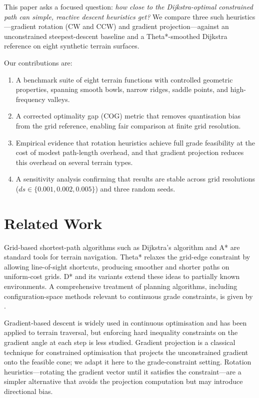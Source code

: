 \documentclass[11pt,a4paper]{article}
\begin{document}
This paper asks a focused question: \emph{how close to the Dijkstra-optimal
constrained path can simple, reactive descent heuristics get?}
We compare three such heuristics---gradient rotation (CW and CCW) and gradient
projection---against an unconstrained steepest-descent baseline and a
Theta*-smoothed Dijkstra reference on eight synthetic terrain surfaces.

Our contributions are:
\begin{enumerate}
  \item A benchmark suite of eight terrain functions with controlled geometric
        properties, spanning smooth bowls, narrow ridges, saddle points, and
        high-frequency valleys.
  \item A corrected optimality gap (COG) metric that removes quantisation bias
        from the grid reference, enabling fair comparison at finite grid
        resolution.
  \item Empirical evidence that rotation heuristics achieve full grade
        feasibility at the cost of modest path-length overhead, and that
        gradient projection reduces this overhead on several terrain types.
  \item A sensitivity analysis confirming that results are stable across grid
        resolutions ($ds \in \{0.001, 0.002, 0.005\}$) and three random seeds.
\end{enumerate}

\section{Related Work}
\label{sec:related}

Grid-based shortest-path algorithms such as Dijkstra's algorithm
\citep{Dijkstra1959} and A* \citep{Hart1968} are standard tools for
terrain navigation.
Theta* \citep{Daniel2014} relaxes the grid-edge constraint by allowing
line-of-sight shortcuts, producing smoother and shorter paths on uniform-cost
grids.
D* and its variants \citep{Stentz1994} extend these ideas to partially known
environments.
A comprehensive treatment of planning algorithms, including configuration-space
methods relevant to continuous grade constraints, is given by
\citet{Lavalle2006}.

Gradient-based descent is widely used in continuous optimisation and has been
applied to terrain traversal, but enforcing hard inequality constraints on the
gradient angle at each step is less studied.
Gradient projection is a classical technique for constrained optimisation
\citep{Lavalle2006} that projects the unconstrained gradient onto the feasible
cone; we adapt it here to the grade-constraint setting.
Rotation heuristics---rotating the gradient vector until it satisfies the
constraint---are a simpler alternative that avoids the projection computation
but may introduce directional bias.
\end{document}
